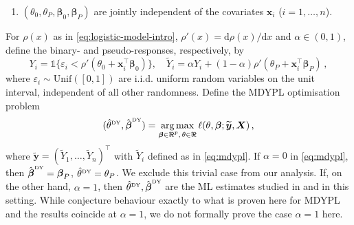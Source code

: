 \documentclass{article}
\theoremstyle{definition}
\newcommand*{\bb}{\boldsymbol}
\newcommand{\tnod}{\ensuremath{{\theta_{0}}}}
\newcommand{\betady}{\ensuremath{\hat{\bbeta}^{\textrm{\tiny DY}}}}
\newcommand{\thetady}{\ensuremath{\hat{\theta}^{\textrm{\tiny DY}}}}
\def\bX{\bb{X}}
\def\bx{\bb{x}}
\def\Ytil{\widetilde{Y}}
\def\bYtil{\widetilde{\bb{y}}}
\def\bbeta{\bb{\beta}}
\begin{document}
\begin{bibunit}
\begin{enumerate}[label = (\roman{*})]
$${\begin{bmatrix}
			\theta_0 \\ \theta_P \end{bmatrix} - \begin{bmatrix}
				\theta_0^* \\ \theta_P^*
			\end{bmatrix}}_{\infty} > t
			\right) \leq C_{\Theta} \exp \{-c_{\Theta}nt^2\} \,,
	$$
	for some universal constants $c_{\Theta}, C_{\Theta}$ and a $n_0 \in \mathbb{N}$.
    \item $(\theta_0, \theta_P, \bbeta_0, \bbeta_P)$ are jointly independent of the covariates $\bx_i$ ($i = 1, \ldots, n$).
\end{enumerate}
For $\rho(x)$ as in \eqref{eq:logistic-model-intro}, $\rho'(x) = \mathrm d \rho(x) / \mathrm dx$ and $\alpha \in (0,1)$, define the binary-
and pseudo-responses, respectively, by
\begin{equation}
    \label{eq:mdypl}
	Y_i
	=
	\mathds{1}\{ \varepsilon_i < \rho'(\tnod + \bx_i^\top \bbeta_{0})\}, \quad \Ytil_i = \alpha Y_i + (1-\alpha) \rho'(\theta_P + \bx_i^\top\bbeta_{P})\,,
\end{equation}
where $\varepsilon_i \sim \mathrm{Unif}([0,1])$ are i.i.d. uniform random variables on the unit interval, independent of all other randomness.
Define the MDYPL optimisation problem
\begin{equation}
    \label{eq:og}
	(\thetady, \betady) = \underset{\substack{\bbeta \in \Re^p, \, \theta \in \Re}}{\arg\max} \, \ell(\theta, \bbeta ; \bYtil, \bX)
	\,,
\end{equation}
where $\bYtil = (\widetilde{Y}_1, \ldots, \widetilde{Y}_n)^\top$ with $\Ytil_i$ defined as in \eqref{eq:mdypl}.
If $\alpha = 0$ in \eqref{eq:mdypl}, then $\betady = \bbeta_P$, $\thetady = \theta_P$. We exclude this trivial case from our analysis.
If, on the other hand, $\alpha = 1$, then $\thetady, \betady$ are the ML estimates studied in \citet{sur+candes:2019} and \citet{zhao+etal:2022} in this setting.
While \citet{zhao+etal:2022} conjecture behaviour exactly to what is proven here for MDYPL and the results coincide at $\alpha = 1$, we do not formally prove the case $\alpha = 1$ here.

\end{bibunit}
\end{document}
